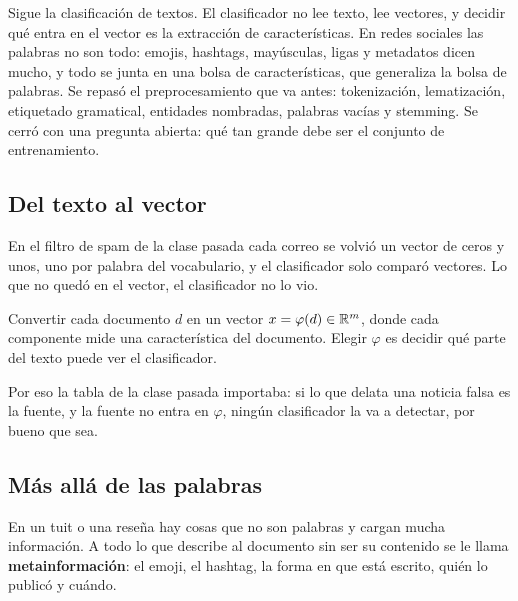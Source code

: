 \documentclass[11pt,letterpaper]{article}
\begin{document}
\newpage


\begin{quick_sum}
    Sigue la clasificación de textos. El clasificador no lee texto,
    lee vectores, y decidir qué entra en el vector es la extracción de
    características. En redes sociales las palabras no son todo:
    emojis, hashtags, mayúsculas, ligas y metadatos dicen mucho, y
    todo se junta en una bolsa de características, que generaliza la
    bolsa de palabras. Se repasó el preprocesamiento que va antes:
    tokenización, lematización, etiquetado gramatical, entidades
    nombradas, palabras vacías y stemming. Se cerró con una pregunta
    abierta: qué tan grande debe ser el conjunto de entrenamiento.
\end{quick_sum}

\subsection*{Del texto al vector}

En el filtro de spam de la clase pasada cada correo se volvió un
vector de ceros y unos, uno por palabra del vocabulario, y el
clasificador solo comparó vectores. Lo que no quedó en el vector, el
clasificador no lo vio.

\begin{definicion}
    Convertir cada documento $d$ en un vector
    $x = \varphi(d) \in \mathbb{R}^m$, donde cada componente mide una
    característica del documento. Elegir $\varphi$ es decidir qué
    parte del texto puede ver el clasificador.
\end{definicion}

Por eso la tabla de la clase pasada importaba: si lo que delata una
noticia falsa es la fuente, y la fuente no entra en $\varphi$, ningún
clasificador la va a detectar, por bueno que sea.


\subsection*{Más allá de las palabras}

En un tuit o una reseña hay cosas que no son palabras y cargan mucha
información. A todo lo que describe al documento sin ser su
contenido se le llama \textbf{metainformación}: el emoji, el hashtag,
la forma en que está escrito, quién lo publicó y cuándo.
\end{document}
